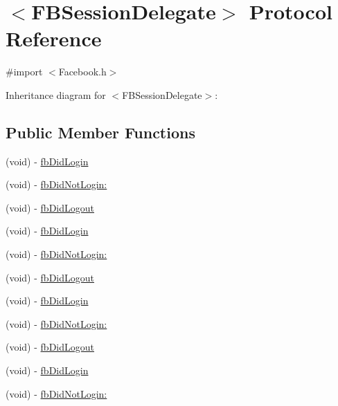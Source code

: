 \hypertarget{protocol_f_b_session_delegate-p}{
\section{$<$\-F\-B\-Session\-Delegate$>$ \-Protocol \-Reference}
\label{protocol_f_b_session_delegate-p}
}


{\ttfamily \#import $<$\-Facebook.\-h$>$}



\-Inheritance diagram for $<$\-F\-B\-Session\-Delegate$>$\-:
\subsection*{\-Public \-Member \-Functions}
\begin{DoxyCompactItemize}
\item 
(void) -\/ \hyperlink{protocol_f_b_session_delegate-p_ab12acc7e3f693dcbf5f9ffe51fdf0b6d}{fb\-Did\-Login}
\item 
(void) -\/ \hyperlink{protocol_f_b_session_delegate-p_aa6e3356a2554da580a58d3edbfa777e1}{fb\-Did\-Not\-Login\-:}
\item 
(void) -\/ \hyperlink{protocol_f_b_session_delegate-p_a26f8c3d8a55718a2cb0b59f262cd620f}{fb\-Did\-Logout}
\item 
(void) -\/ \hyperlink{protocol_f_b_session_delegate-p_ab12acc7e3f693dcbf5f9ffe51fdf0b6d}{fb\-Did\-Login}
\item 
(void) -\/ \hyperlink{protocol_f_b_session_delegate-p_aa6e3356a2554da580a58d3edbfa777e1}{fb\-Did\-Not\-Login\-:}
\item 
(void) -\/ \hyperlink{protocol_f_b_session_delegate-p_a26f8c3d8a55718a2cb0b59f262cd620f}{fb\-Did\-Logout}
\item 
(void) -\/ \hyperlink{protocol_f_b_session_delegate-p_ab12acc7e3f693dcbf5f9ffe51fdf0b6d}{fb\-Did\-Login}
\item 
(void) -\/ \hyperlink{protocol_f_b_session_delegate-p_aa6e3356a2554da580a58d3edbfa777e1}{fb\-Did\-Not\-Login\-:}
\item 
(void) -\/ \hyperlink{protocol_f_b_session_delegate-p_a26f8c3d8a55718a2cb0b59f262cd620f}{fb\-Did\-Logout}
\item 
(void) -\/ \hyperlink{protocol_f_b_session_delegate-p_ab12acc7e3f693dcbf5f9ffe51fdf0b6d}{fb\-Did\-Login}
\item 
(void) -\/ \hyperlink{protocol_f_b_session_delegate-p_aa6e3356a2554da580a58d3edbfa777e1}{fb\-Did\-Not\-Login\-:}
\item 

\end{DoxyCompactItemize}
